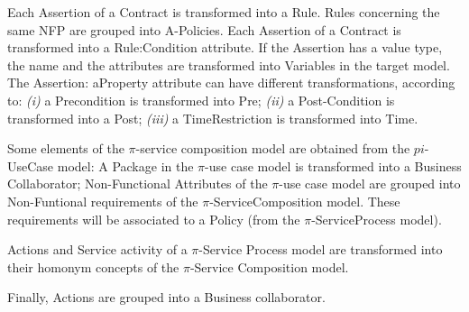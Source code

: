 Each {\sf Assertion} of a {\sf Contract} is transformed into a {\sf Rule}. 
{\sf Rules}  concerning the same NFP  are grouped into {\sf A-Policies}. 
Each {\sf Assertion} of a {\sf Contract} is transformed into a {\sf Rule:Condition} attribute. 
If the {\sf Assertion} has a value type, the name and the attributes are transformed into {\sf Variables} in the target model.  
The {\sf Assertion: aProperty} attribute can have different transformations, according to: 
\textit{(i)} a {\sf Precondition} is transformed into {\sf Pre};
\textit{(ii)} a {\sf Post-Condition} is transformed into a {\sf  Post};
\textit{(iii)} a {\sf TimeRestriction} is transformed into {\sf Time}.

%

Some elements of the $\pi$-service composition model are obtained from the $pi$-UseCase model: 
A {\sf Package} in the $\pi$-use case model is transformed into a {\sf Business Collaborator};
\textsf{Non-Functional Attributes} of the $\pi$-use case model are grouped into \textsf{Non-Funtional requirements} of the $\pi$-ServiceComposition model. 
These requirements will be associated to a \textsf{Policy} (from the $\pi$-ServiceProcess model).




{\sf Actions} and {\sf Service activity} of a $\pi$-Service Process model are transformed into their homonym concepts of the $\pi$-Service Composition model.

Finally, {\sf Actions} are grouped into  a {\sf Business collaborator}.




